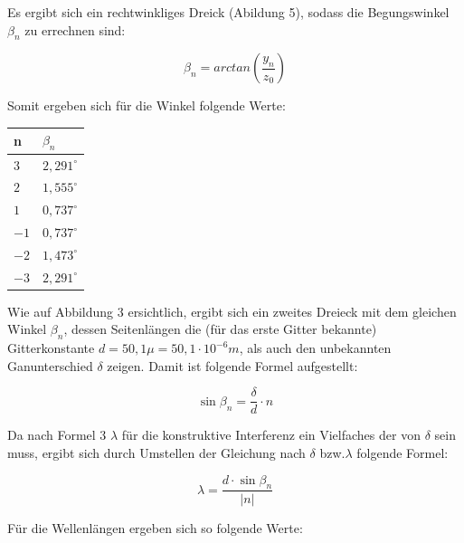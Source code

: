 \documentclass[12pt,a4paper,titlepage,headinclude,bibtotoc]{scrartcl}
\begin{document}
Es ergibt sich ein rechtwinkliges Dreick (Abildung 5), sodass die Begungswinkel $\beta_n$ zu errechnen sind:

\begin{equation}
\beta_n = arctan(\frac{y_n}{z_0})
\end{equation}

\par

Somit ergeben sich für die Winkel folgende Werte: 

\begin{table} [h]
\centering
\begin{tabular}{|p{4 cm}||p{4 cm}|}
        \hline
		n& $\beta_n$\\
         \hline 
         $3$ & $2,291^\circ$  \\
         \hline
         $2$ & $1,555^\circ$\\
         \hline
         $1$ & $0,737^\circ$ \\
         \hline
         $-1$ & $0,737^\circ$ \\
         \hline
         $-2$ & $1,473^\circ$ \\
         \hline             
         $-3$ & $2,291^\circ$ \\
         \hline
\end{tabular}
\end{table}

Wie auf Abbildung 3 ersichtlich, ergibt sich ein zweites Dreieck mit dem gleichen Winkel $\beta_n$, dessen Seitenlängen die (für das erste Gitter bekannte) Gitterkonstante $d= 50,1\mu=50,1\cdot10^{-6}m$, als auch den unbekannten Ganunterschied $\delta$ zeigen. Damit ist folgende Formel aufgestellt:

\begin{equation}
\sin{\beta_n}=\frac{\delta}{d}\cdot n
\end{equation}

Da nach Formel 3 $\lambda$ für die konstruktive Interferenz ein Vielfaches der von $\delta$ sein muss, ergibt sich durch Umstellen der Gleichung nach $\delta$ bzw.$\lambda$ folgende Formel:

\begin{equation}
\lambda = \frac{d\cdot \sin\beta_n}{|n|}
\end{equation}

Für die Wellenlängen ergeben sich so folgende Werte:
\end{document}
